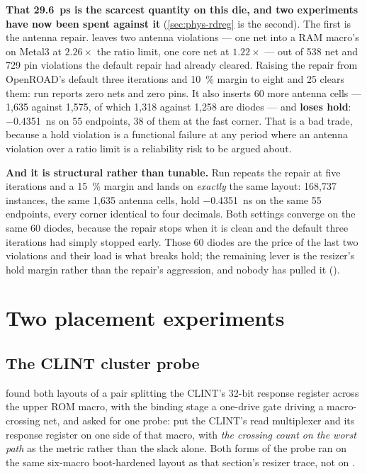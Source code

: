 \textbf{That \qty{29.6}{\pico\second} is the scarcest quantity on this
die, and two experiments have now been spent against it}
(\cref{sec:phys-rdreg} is the second). The first is the antenna repair.  leaves two antenna violations ---
one net into a RAM macro's  on Metal3 at
$2.26\times$ the ratio limit, one core net at $1.22\times$ --- out of
538 net and 729 pin violations the default repair had already cleared.
Raising the repair from OpenROAD's default three iterations and
\qty{10}{\percent} margin to eight and \num{25} clears them: run
 reports zero nets and zero pins. It also inserts 60 more
antenna cells --- 1,635 against 1,575, of which 1,318 against 1,258 are
diodes --- and \textbf{loses hold}: \qty{-0.4351}{\nano\second} on 55
endpoints, 38 of them at the fast corner. That is a bad trade, because a
hold violation is a functional failure at any period where an antenna
violation over a ratio limit is a reliability risk to be argued about.

\textbf{And it is structural rather than tunable.} Run 
repeats the repair at five iterations and a \qty{15}{\percent} margin
and lands on \emph{exactly} the same layout: 168,737 instances, the same
1,635 antenna cells, hold \qty{-0.4351}{\nano\second} on the same 55
endpoints, every corner identical to four decimals. Both settings
converge on the same 60 diodes, because the repair stops when it is
clean and the default three iterations had simply stopped early. Those
60 diodes are the price of the last two violations and their load is
what breaks hold; the remaining lever is the resizer's hold margin
rather than the repair's aggression, and nobody has pulled it
().

\section{Two placement experiments}

\subsection{The CLINT cluster probe}
\label{sec:phys-clint}

 found both layouts of a pair splitting the
CLINT's 32-bit response register across the upper ROM macro, with the
binding stage a one-drive gate driving a macro-crossing net, and asked
for one probe: put the CLINT's read multiplexer and its response
register on one side of that macro, with \emph{the crossing count on the
worst path} as the metric rather than the slack alone. Both forms of the
probe ran on the same six-macro boot-hardened layout as that section's
resizer trace, not on .

